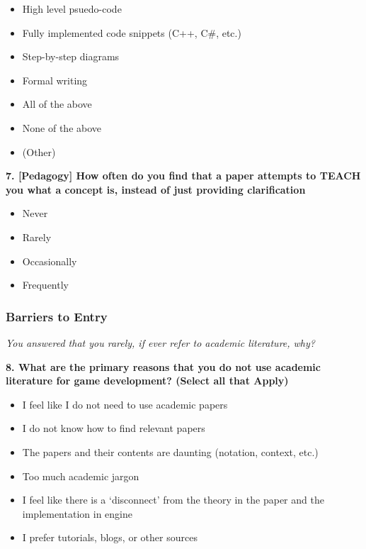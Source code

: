 \begin{itemize}
    \item High level psuedo-code
    \item Fully implemented code snippets (C++, C\#, etc.)
    \item Step-by-step diagrams
    \item Formal writing
    \item All of the above
    \item None of the above
    \item (Other)
\end{itemize}

\vspace{2em}

\textbf{7. [Pedagogy] How often do you find that a paper attempts to TEACH you what a concept is, instead of just providing clarification}

\begin{itemize}
    \item Never
    \item Rarely
    \item Occasionally
    \item Frequently
\end{itemize}


\subsubsection{Barriers to Entry}

\textit{You answered that you rarely, if ever refer to academic literature, why?}

\vspace{1em}

\textbf{8. What are the primary reasons that you do not use academic literature for game development? (Select all that Apply)}

\begin{itemize}
    \item I feel like I do not need to use academic papers
    \item I do not know how to find relevant papers
    \item The papers and their contents are daunting (notation, context, etc.)
    \item Too much academic jargon
    \item I feel like there is a `disconnect' from the theory in the paper and the implementation in engine
    \item I prefer tutorials, blogs, or other sources
\end{itemize}

